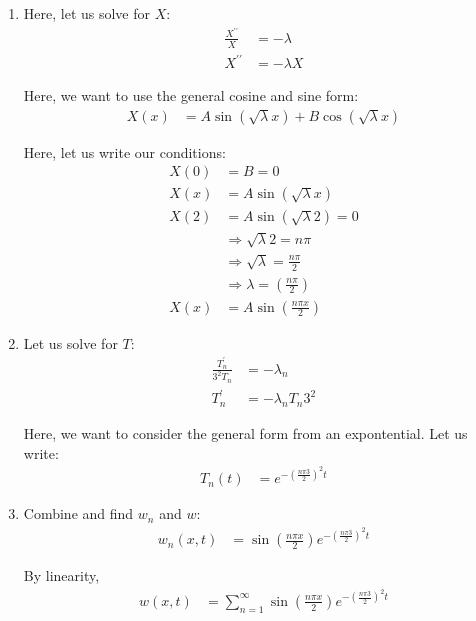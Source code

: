 \documentclass{article}
\begin{document}
\begin{enumerate}
\begin{enumerate}
  \item Here, let us solve for $X$:
  \begin{align}
    \frac{X^{\prime\prime}}{X} & = -\lambda\\
    X^{\prime\prime} & = -\lambda X
  \end{align}

  Here, we want to use the general cosine and sine form:
  \begin{align}
    X(x) & = A \sin \left( \sqrt \lambda x \right) + B \cos \left( \sqrt \lambda x \right)
  \end{align}

  Here, let us write our conditions:
  \begin{align}
    X(0) & = B = 0\\
    X(x) & = A \sin \left( \sqrt \lambda x \right)\\
    X(2) & = A \sin \left( \sqrt \lambda 2 \right) = 0\\
    & \Rightarrow \sqrt \lambda 2 = n \pi\\
    & \Rightarrow \sqrt \lambda = \frac{n \pi}{2}\\
    & \Rightarrow \lambda = \left(\frac{n \pi}{2}\right)\\
    X(x) & = A \sin\left(\frac{n \pi x}{2}\right)
  \end{align}

  \item Let us solve for $T$:
  \begin{align}
    \frac{T^\prime_n}{3^2 T_n} & = -\lambda_n\\
    T^\prime_n & = -\lambda_n T_n 3^2
  \end{align}

  Here, we want to consider the general form from an expontential. Let us write:
  \begin{align}
    T_n(t) & = e^{- \left( \frac{n \pi 3}{2} \right)^2 t}
  \end{align}

  \item Combine and find $w_n$ and $w$:
  \begin{align}
    w_n(x, t) & =
    \sin\left(\frac{n \pi x}{2}\right)
    e^{- \left( \frac{n \pi 3}{2} \right)^2 t}
  \end{align}

  By linearity,
  \begin{align}
    w(x, t) & =
    \sum^\infty_{n = 1}
    \sin\left(\frac{n \pi x}{2}\right)
    e^{- \left( \frac{n \pi 3}{2} \right)^2 t}
  \end{align}


\end{enumerate}
\end{enumerate}
\end{document}
